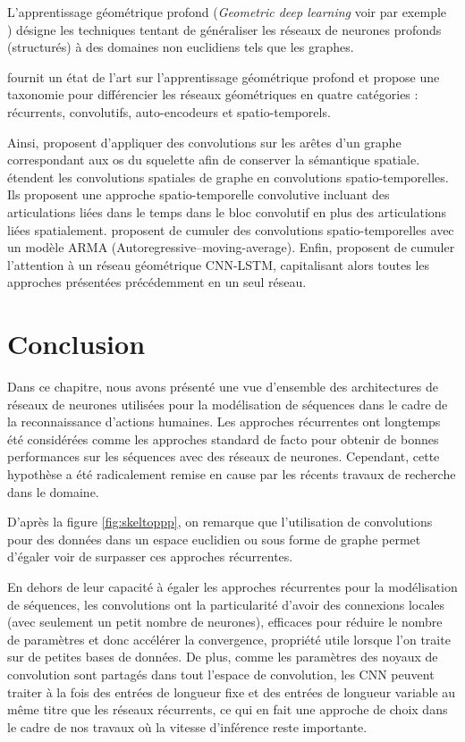 L'apprentissage géométrique profond (\textit{Geometric deep learning} voir par exemple \\ \cite{gori2005new,scarselli2008graph,bronstein2017geometric}) désigne les techniques tentant de généraliser les réseaux de neurones profonds (structurés) à des domaines non euclidiens tels que les graphes. 

\cite{wu2019comprehensive} fournit un état de l'art sur l'apprentissage géométrique profond et propose une taxonomie pour différencier les réseaux géométriques en quatre catégories : récurrents, convolutifs, auto-encodeurs et spatio-temporels.

Ainsi, \cite{2018arXiv180506184Z} proposent d'appliquer des convolutions sur les arêtes d'un graphe correspondant aux os du squelette afin de conserver la sémantique spatiale.
\cite{yan2018spatial} étendent les convolutions spatiales de graphe en convolutions spatio-temporelles. Ils proposent une approche spatio-temporelle convolutive incluant des articulations liées dans le temps dans le bloc convolutif en plus des articulations liées spatialement. \cite{2018arXiv180209834L} proposent de cumuler des convolutions spatio-temporelles avec un modèle ARMA (Autoregressive–moving-average). Enfin, \cite{Si_2019_CVPR} proposent de cumuler l'attention à un réseau géométrique CNN-LSTM, capitalisant alors toutes les approches présentées précédemment en un seul réseau.

\section{Conclusion}
Dans ce chapitre, nous avons présenté une vue d'ensemble des architectures de réseaux de neurones utilisées pour la modélisation de séquences dans le cadre de la reconnaissance d'actions humaines. Les approches récurrentes ont longtemps été considérées comme les approches standard de facto pour obtenir de bonnes performances sur les séquences avec des réseaux de neurones. Cependant, cette hypothèse a été radicalement remise en cause par les récents travaux de recherche dans le domaine. 

D'après la figure \ref{fig:skeltoppp}, on remarque que l'utilisation de convolutions pour des données dans un espace euclidien ou sous forme de graphe permet d'égaler voir de surpasser ces approches récurrentes.

En dehors de leur capacité à égaler les approches récurrentes pour la modélisation de séquences, les convolutions ont la particularité d'avoir des connexions locales (avec seulement un petit nombre de neurones), efficaces pour réduire le nombre de paramètres et donc accélérer la convergence, propriété utile lorsque l'on traite sur de petites bases de données. De plus, comme les paramètres des noyaux de convolution sont partagés dans tout l'espace de convolution, les CNN peuvent traiter à la fois des entrées de longueur fixe et des entrées de longueur variable au même titre que les réseaux récurrents, ce qui en fait une approche de choix dans le cadre de nos travaux où la vitesse d'inférence reste importante.



